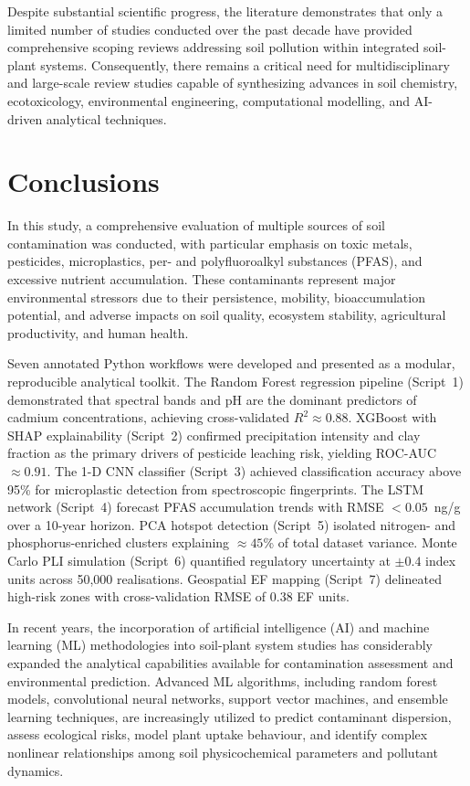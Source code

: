 \documentclass[land,article,submit,pdftex,moreauthors]{Definitions/mdpi}
\begin{document}
Despite substantial scientific progress, the literature demonstrates that only
a limited number of studies conducted over the past decade have provided
comprehensive scoping reviews addressing soil pollution within integrated
soil-plant systems. Consequently, there remains a critical need for
multidisciplinary and large-scale review studies capable of synthesizing
advances in soil chemistry, ecotoxicology, environmental engineering,
computational modelling, and AI-driven analytical techniques.

\section{Conclusions}\label{sec7}

In this study, a comprehensive evaluation of multiple sources of soil
contamination was conducted, with particular emphasis on toxic metals,
pesticides, microplastics, per- and polyfluoroalkyl substances (PFAS), and
excessive nutrient accumulation. These contaminants represent major
environmental stressors due to their persistence, mobility, bioaccumulation
potential, and adverse impacts on soil quality, ecosystem stability,
agricultural productivity, and human health.

Seven annotated Python workflows were developed and presented as a modular,
reproducible analytical toolkit. The Random Forest regression pipeline
(Script~1) demonstrated that spectral bands and pH are the dominant predictors
of cadmium concentrations, achieving cross-validated $R^2 \approx 0.88$.
XGBoost with SHAP explainability (Script~2) confirmed precipitation intensity
and clay fraction as the primary drivers of pesticide leaching risk, yielding
ROC-AUC $\approx 0.91$. The 1-D CNN classifier (Script~3) achieved
classification accuracy above 95\% for microplastic detection from
spectroscopic fingerprints. The LSTM network (Script~4) forecast PFAS
accumulation trends with RMSE $< 0.05$~ng/g over a 10-year horizon. PCA
hotspot detection (Script~5) isolated nitrogen- and phosphorus-enriched
clusters explaining $\approx 45$\% of total dataset variance. Monte Carlo
PLI simulation (Script~6) quantified regulatory uncertainty at $\pm 0.4$
index units across 50,000 realisations. Geospatial EF mapping (Script~7)
delineated high-risk zones with cross-validation RMSE of 0.38 EF units.

In recent years, the incorporation of artificial intelligence (AI) and machine
learning (ML) methodologies into soil-plant system studies has considerably
expanded the analytical capabilities available for contamination assessment
and environmental prediction. Advanced ML algorithms, including random forest
models, convolutional neural networks, support vector machines, and ensemble
learning techniques, are increasingly utilized to predict contaminant
dispersion, assess ecological risks, model plant uptake behaviour, and identify
complex nonlinear relationships among soil physicochemical parameters and
pollutant dynamics.
\end{document}
